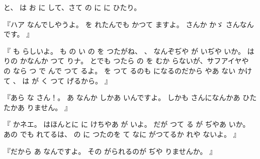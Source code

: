 と、
は
お
に
して、さて
の
に
に
ひたり。

『ハア
なんでしやうよ。
を
れたんでも
かつて
ますよ。
さんか
かゞ
さんなんです。
』

『
も
らしいよ。
も
の
い
の
を
つたがね、
、
なんぞぢや
が
いぢや
いか。
は
りの
かなんか
つて
りナ。
とでも
つたら
の
を
むか
らないが、サフアイヤや
の
なら
つ
で
んで
つて
るよ。
を
つて
るのも
になるのだから
やあ
ない
かけて
、
は
が
く
つて
げるから。
』

『あら
な
さん！。
あ
なんか
しかあ
いんですよ。
しかも
さんになんかあ
ひたたかあ
りません。
』

『
かネエ。
はほんとに
に
けちやあ
が
いよ。
だが
つて
る
が
ぢやあ%
いか。
あの
でも
れてるは、
の
に
つたのを
て
なに
がつてるか
れや
ないよ。
』

『だから
あ
なんですよ。
その
がられるのが
ぢや
りませんか。
』

